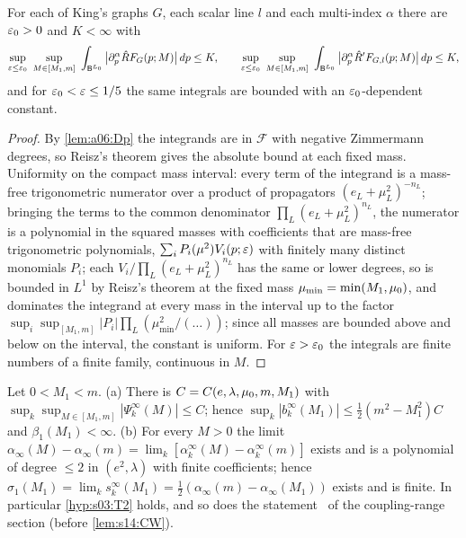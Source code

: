 \begin{proposition}\label{prop:a06:RD}
For each of King's graphs $G$, each scalar line $l$ and each multi-index $\alpha$ there are $\varepsilon_0>0$ and $K<\infty$ with
\[
\sup_{\eps\le\eps_0}\ \sup_{M\in[M_1,m]}\ \int_{\BZ^{L_0}}\big|\partial^\alpha_p\hat RF_G(p;M)\big|\,dp\le K,\qquad
\sup_{\eps\le\eps_0}\ \sup_{M\in[M_1,m]}\ \int_{\BZ^{L_0}}\big|\partial^\alpha_p\hat R'F_{G,l}(p;M)\big|\,dp\le K,
\]
and for $\varepsilon_0<\varepsilon\le1/5$ the same integrals are bounded with an $\varepsilon_0$-dependent constant.
\end{proposition}

\begin{proof}
By \cref{lem:a06:Dp} the integrands are in $\mathcal F$ with negative Zimmermann degrees, so Reisz's theorem gives the absolute bound at each fixed mass. Uniformity on the compact mass interval: every term of the integrand is a mass-free trigonometric numerator over a product of propagators $(e_L+\mu_L^2)^{-n_L}$; bringing the terms to the common denominator $\prod_L(e_L+\mu_L^2)^{n_L}$, the numerator is a polynomial in the squared masses with coefficients that are mass-free trigonometric polynomials, $\sum_iP_i(\mu^2)V_i(p;\varepsilon)$ with finitely many distinct monomials $P_i$; each $V_i/\prod_L(e_L+\mu_L^2)^{n_L}$ has the same or lower degrees, so is bounded in $L^1$ by Reisz's theorem at the fixed mass $\mu_{\min}=\min(M_1,\mu_0)$, and dominates the integrand at every mass in the interval up to the factor $\sup_i\sup_{[M_1,m]}|P_i|\prod_L(\mu_{\min}^2/(\ldots))$; since all masses are bounded above and below on the interval, the constant is uniform. For $\varepsilon>\varepsilon_0$ the integrals are finite numbers of a finite family, continuous in $M$.
\end{proof}

\begin{theorem}\label{thm:a06:CD1}
Let $0<M_1<m$. \textup{(a)} There is $C=C(e,\lambda,\mu_0,m,M_1)$ with $\sup_{k}\sup_{M\in[M_1,m]}|\Psi^\infty_k(M)|\le C$; hence $\sup_k|b^\infty_k(M_1)|\le\frac12(m^2-M_1^2)C$ and $\beta_1(M_1)<\infty$. \textup{(b)} For every $M>0$ the limit $\alpha_\infty(M)-\alpha_\infty(m)=\lim_k[\alpha^\infty_k(M)-\alpha^\infty_k(m)]$ exists and is a polynomial of degree $\le2$ in $(e^2,\lambda)$ with finite coefficients; hence $\sigma_1(M_1)=\lim_ks^\infty_k(M_1)=\frac12(\alpha_\infty(m)-\alpha_\infty(M_1))$ exists and is finite. In particular \cref{hyp:s03:T2} holds, and so does the statement \sxivCT\ of the coupling-range section (before \cref{lem:s14:CW}).
\end{theorem}

